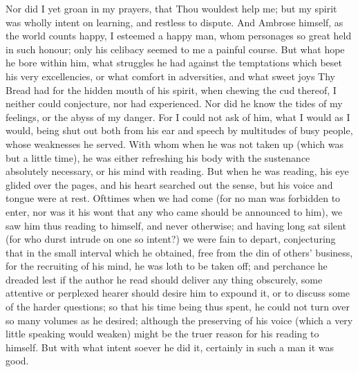 \documentclass[b5paper,openright,12pt,twoside]{book}
\begin{document}
Nor did I yet groan in my prayers, that Thou wouldest help me; but
my spirit was wholly intent on learning, and restless to dispute. And
Ambrose himself, as the world counts happy, I esteemed a happy man, whom
personages so great held in such honour; only his celibacy seemed to me
a painful course. But what hope he bore within him, what struggles he
had against the temptations which beset his very excellencies, or what
comfort in adversities, and what sweet joys Thy Bread had for the hidden
mouth of his spirit, when chewing the cud thereof, I neither could
conjecture, nor had experienced. Nor did he know the tides of my
feelings, or the abyss of my danger. For I could not ask of him, what
I would as I would, being shut out both from his ear and speech by
multitudes of busy people, whose weaknesses he served. With whom when he
was not taken up (which was but a little time), he was either refreshing
his body with the sustenance absolutely necessary, or his mind with
reading. But when he was reading, his eye glided over the pages, and
his heart searched out the sense, but his voice and tongue were at rest.
Ofttimes when we had come (for no man was forbidden to enter, nor was it
his wont that any who came should be announced to him), we saw him thus
reading to himself, and never otherwise; and having long sat silent
(for who durst intrude on one so intent?) we were fain to depart,
conjecturing that in the small interval which he obtained, free from the
din of others' business, for the recruiting of his mind, he was loth to
be taken off; and perchance he dreaded lest if the author he read should
deliver any thing obscurely, some attentive or perplexed hearer should
desire him to expound it, or to discuss some of the harder questions; so
that his time being thus spent, he could not turn over so many volumes
as he desired; although the preserving of his voice (which a very little
speaking would weaken) might be the truer reason for his reading to
himself. But with what intent soever he did it, certainly in such a man
it was good.
\end{document}
